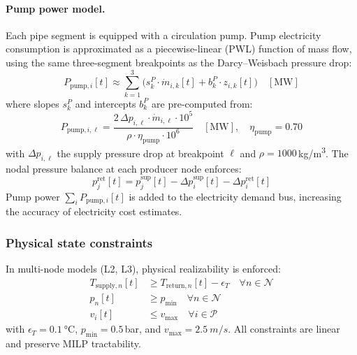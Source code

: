 \documentclass[a4paper,fleqn]{cas-dc}
\begin{document}
\paragraph{Pump power model.}
Each pipe segment is equipped with a circulation pump. Pump electricity consumption is approximated as a piecewise-linear (PWL) function of mass flow, using the same three-segment breakpoints as the Darcy--Weisbach pressure drop:
\begin{equation}
P_{\mathrm{pump},i}[t] \approx \sum_{k=1}^{3}
  \bigl(s_k^P \cdot \dot{m}_{i,k}[t] + b_k^P \cdot z_{i,k}[t]\bigr) \quad [\text{MW}]
\label{eq:pump_power}
\end{equation}
where slopes $s_k^P$ and intercepts $b_k^P$ are pre-computed from:
\begin{equation}
P_{\mathrm{pump},i,\ell} =
  \frac{2\,\Delta p_{i,\ell} \cdot \dot{m}_{i,\ell} \cdot 10^5}
       {\rho \cdot \eta_{\mathrm{pump}} \cdot 10^6}
\quad [\text{MW}], \quad \eta_{\mathrm{pump}} = 0.70
\label{eq:pump_bp}
\end{equation}
with $\Delta p_{i,\ell}$ the supply pressure drop at breakpoint $\ell$ and $\rho = 1000$\,\si{kg/m^3}. The nodal pressure balance at each producer node enforces:
\begin{equation}
p_j^{\mathrm{ret}}[t] = p_j^{\mathrm{sup}}[t]
  - \Delta p_i^{\mathrm{sup}}[t] - \Delta p_i^{\mathrm{ret}}[t]
\label{eq:pump_head}
\end{equation}
Pump power $\sum_i P_{\mathrm{pump},i}[t]$ is added to the electricity demand bus, increasing the accuracy of electricity cost estimates.

\subsubsection{Physical state constraints}

In multi-node models (L2, L3), physical realizability is enforced:
\begin{align}
T_{\mathrm{supply},n}[t] &\geq T_{\mathrm{return},n}[t] - \epsilon_T \quad \forall n \in \mathcal{N} \label{eq:temp_valid} \\
p_n[t] &\geq p_\mathrm{min} \quad \forall n \in \mathcal{N} \label{eq:pressure_min} \\
v_i[t] &\leq v_\mathrm{max} \quad \forall i \in \mathcal{P} \label{eq:velocity_max}
\end{align}
with $\epsilon_T = \SI{0.1}{\degreeCelsius}$, $p_\mathrm{min} = 0.5$\,bar, and $v_\mathrm{max} = \SI{2.5}{m/s}$. All constraints are linear and preserve MILP tractability.
\end{document}
